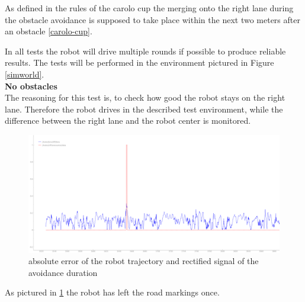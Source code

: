 As defined in the rules of the carolo cup the merging onto the right lane during the obstacle avoidance is supposed to take place within the next two meters after an obstacle \ref{carolo-cup}.

In all tests the robot will drive multiple rounds if possible to produce reliable results. The tests will be performed in the environment pictured in Figure \ref{simworld}.\\

\textbf{No obstacles}\\
The reasoning for this test is, to check how good the robot stays on the right lane. Therefore the robot drives in the described test environment, while the difference between the right lane and the robot center is monitored.

\begin{figure}[H]
	\includegraphics[width=\textwidth]{Pictures/final analysis no obstacle}
	\caption{absolute error of the robot trajectory and rectified signal of the avoidance duration}
	\label{noobserr}
\end{figure}

As pictured in \ref{noobserr} the robot has left the road markings once.\\

